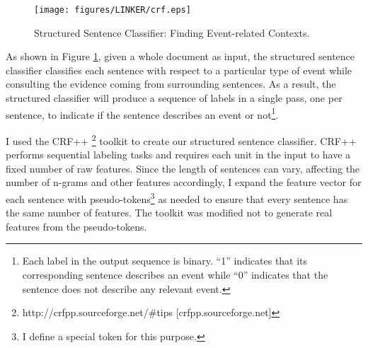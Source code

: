   \begin{figure}[h]
 \centering
 \texttt{[image: figures/LINKER/crf.eps]}
 \caption{Structured Sentence Classifier: Finding Event-related Contexts.}
\label{crf}
\end{figure} 

 As shown in Figure \ref{crf},
given a whole document as input, the structured sentence classifier 
classifies each sentence with respect to a particular type of event while 
consulting the evidence coming from surrounding sentences. 
As a result, the structured classifier will produce 
a sequence of labels in a single pass, one per sentence, 
to indicate if the sentence describes an event or not\footnote{
Each label in the output sequence is binary. ``1'' indicates that 
its corresponding sentence describes an event while ``0'' indicates that 
the sentence does not describe any relevant event.}. 


I used the CRF++ \footnote{http://crfpp.sourceforge.net/\#tips [crfpp.sourceforge.net]} toolkit
to create our structured sentence classifier. CRF++ performs
sequential labeling tasks and requires each unit in the
input to have a fixed number of raw features. Since the length of
sentences can vary, affecting the number of n-grams and other features accordingly, I
expand the feature vector for each sentence with pseudo-tokens\footnote{I define a
  special token for this purpose.} as needed to ensure that every
sentence has the same number of features. The toolkit was modified not to
generate real features from the pseudo-tokens.



